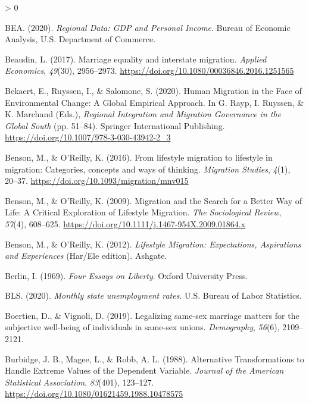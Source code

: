 \documentclass[
  12pt,
]{article}
\newlength{\cslhangindent}
\newenvironment{CSLReferences}[2] %
 {%
  \setlength{\parindent}{0pt}
  \ifodd #1 \everypar{\setlength{\hangindent}{\cslhangindent}}\ignorespaces\fi
  \ifnum #2 > 0
  \setlength{\parskip}{#2\baselineskip}
  \fi
 }%
 {}
\begin{document}
\begin{CSLReferences}{1}{0}
\leavevmode\hypertarget{ref-bea_2020}{}%
BEA. (2020). \emph{Regional {Data}: {GDP} and {Personal Income}}. {Bureau of Economic Analysis, U.S. Department of Commerce}.

\leavevmode\hypertarget{ref-beaudin_2017}{}%
Beaudin, L. (2017). Marriage equality and interstate migration. \emph{Applied Economics}, \emph{49}(30), 2956--2973. \url{https://doi.org/10.1080/00036846.2016.1251565}

\leavevmode\hypertarget{ref-bekaert_2020}{}%
Bekaert, E., Ruyssen, I., \& Salomone, S. (2020). Human {Migration} in the {Face} of {Environmental Change}: A {Global Empirical Approach}. In G. Rayp, I. Ruyssen, \& K. Marchand (Eds.), \emph{Regional {Integration} and {Migration Governance} in the {Global South}} (pp. 51--84). {Springer International Publishing}. \url{https://doi.org/10.1007/978-3-030-43942-2_3}

\leavevmode\hypertarget{ref-benson_2016}{}%
Benson, M., \& O'Reilly, K. (2016). From lifestyle migration to lifestyle in migration: Categories, concepts and ways of thinking. \emph{Migration Studies}, \emph{4}(1), 20--37. \url{https://doi.org/10.1093/migration/mnv015}

\leavevmode\hypertarget{ref-benson_2009}{}%
Benson, M., \& O'Reilly, K. (2009). Migration and the {Search} for a {Better Way} of {Life}: A {Critical Exploration} of {Lifestyle Migration}. \emph{The Sociological Review}, \emph{57}(4), 608--625. \url{https://doi.org/10.1111/j.1467-954X.2009.01864.x}

\leavevmode\hypertarget{ref-benson_2012}{}%
Benson, M., \& O'Reilly, K. (2012). \emph{Lifestyle {Migration}: Expectations, {Aspirations} and {Experiences}} (Har/Ele edition). {Ashgate}.

\leavevmode\hypertarget{ref-berlin_1969_four}{}%
Berlin, I. (1969). \emph{Four {Essays} on {Liberty}}. {Oxford University Press}.

\leavevmode\hypertarget{ref-bls_2020}{}%
BLS. (2020). \emph{Monthly state unemployment rates}. {U.S. Bureau of Labor Statistics}.

\leavevmode\hypertarget{ref-boertien_2019}{}%
Boertien, D., \& Vignoli, D. (2019). Legalizing same-sex marriage matters for the subjective well-being of individuals in same-sex unions. \emph{Demography}, \emph{56}(6), 2109--2121.

\leavevmode\hypertarget{ref-burbidge_1988_alternative}{}%
Burbidge, J. B., Magee, L., \& Robb, A. L. (1988). Alternative {Transformations} to {Handle Extreme Values} of the {Dependent Variable}. \emph{Journal of the American Statistical Association}, \emph{83}(401), 123--127. \url{https://doi.org/10.1080/01621459.1988.10478575}


\end{CSLReferences}
\end{document}
